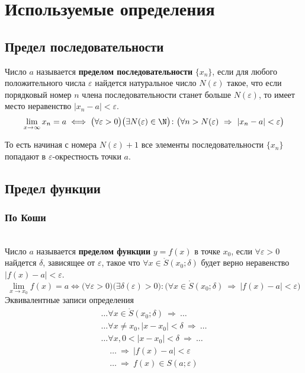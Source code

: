 \newpage
\section{Используемые определения}

\subsection{Предел последовательности}

\begin{definition}
  Число $a$ называется \textbf{пределом последовательности} $\{x_{n}\} $, если для любого положительного числа $\varepsilon$ найдется натуральное число  $N\left(\varepsilon  \right) $ такое, что если порядковый номер $n$ члена последовательности станет больше $N(\varepsilon)$, то имеет место неравенство  $|x_{n} - a| < \varepsilon$.
  \[ \lim_{x \to \infty} x_{n} = a \iff \big(\forall \varepsilon > 0\big)\big(\exists N(\varepsilon) \in \N\big)\colon \big(\forall n > N(\varepsilon)\ \Rightarrow\ |x_{n}-a| < \varepsilon\big) \]
\end{definition}
\begin{note}
    То есть начиная с номера $N(\varepsilon) + 1$ все элементы последовательности $\{x_{n}\} $ попадают в $\varepsilon$-окрестность точки $a$.
\end{note}


\subsection{Предел функции}

\subsubsection{По Коши}

\begin{definition}\ \\
  Число $a$ называется \textbf{пределом функции} $y = f\left( x \right) $ в точке $x_0$, если $\forall \varepsilon > 0$ найдется $\delta$, зависящее от  $\varepsilon$, такое что $\forall x \in \mathring{S}(x_0; \delta)$ будет верно неравенство $|f\left( x \right) - a| < \varepsilon$.
  \[
    \lim_{x \to x_0} f(x) = a \iff \big(\forall \varepsilon > 0\big)\big(\exists  \delta(\varepsilon) > 0\big)\colon \big(\forall  x \in \mathring{S}(x_0; \delta)\ \Rightarrow\ |f(x) - a| < \varepsilon\big)
  \]
Эквивалентные записи определения
  \begin{gather*}
    \ldots \forall x \in \mathring{S}(x_0; \delta)\ \Rightarrow\ \ldots \\
    \ldots \forall x \neq x_0, |x - x_0| < \delta\ \Rightarrow\ \ldots \\
    \ldots \forall x, 0 < |x - x_0| < \delta\ \Rightarrow\ \ldots
  \end{gather*}
  \begin{gather*}
    \ldots\ \Rightarrow\ |f(x) - a| < \varepsilon \\
    \ldots\ \Rightarrow\ f(x) \in S(a; \varepsilon)
  \end{gather*}
\end{definition}


